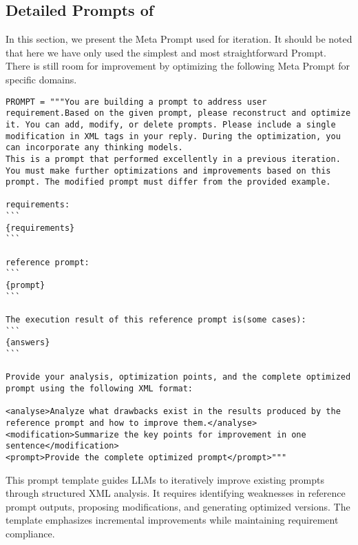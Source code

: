 
\setcounter{table}{0}  
\setcounter{figure}{0}
\setcounter{algorithm}{0}
\renewcommand{\thetable}{A\arabic{table}}
\renewcommand{\thefigure}{A\arabic{figure}}

\subsection{Detailed Prompts of \ours}
\label{appendix:prompt}


In this section, we present the Meta Prompt used for iteration. It should be noted that here we have only used the simplest and most straightforward Prompt. There is still room for improvement by optimizing the following Meta Prompt for specific domains.

\begin{tcolorbox}[title={\textbf{\small Optimize Function's Prompt}}, boxrule=2pt, arc=0mm, breakable]
\begin{verbatim}
PROMPT = """You are building a prompt to address user requirement.Based on the given prompt, please reconstruct and optimize it. You can add, modify, or delete prompts. Please include a single modification in XML tags in your reply. During the optimization, you can incorporate any thinking models.
This is a prompt that performed excellently in a previous iteration. You must make further optimizations and improvements based on this prompt. The modified prompt must differ from the provided example.

requirements:
```
{requirements}
```

reference prompt:
```
{prompt}
```

The execution result of this reference prompt is(some cases):
```
{answers}
```

Provide your analysis, optimization points, and the complete optimized prompt using the following XML format:

<analyse>Analyze what drawbacks exist in the results produced by the reference prompt and how to improve them.</analyse>
<modification>Summarize the key points for improvement in one sentence</modification>
<prompt>Provide the complete optimized prompt</prompt>"""
\end{verbatim}
\end{tcolorbox}


This prompt template guides LLMs to iteratively improve existing prompts through structured XML analysis. It requires identifying weaknesses in reference prompt outputs, proposing modifications, and generating optimized versions. The template emphasizes incremental improvements while maintaining requirement compliance.

